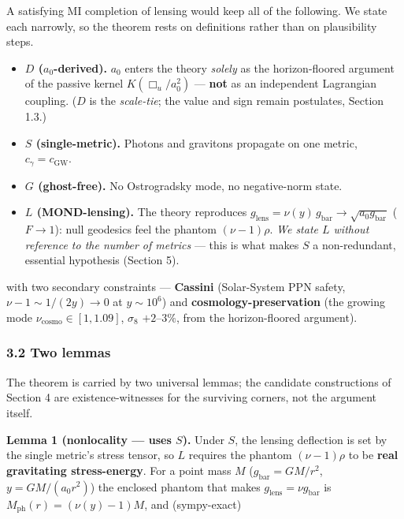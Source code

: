\documentclass[
]{article}
\providecommand{\tightlist}{%
  \setlength{\itemsep}{0pt}\setlength{\parskip}{0pt}}
\begin{document}
A satisfying MI completion of lensing would keep all of the following.
We state each narrowly, so the theorem rests on definitions rather than
on plausibility steps.

\begin{itemize}
\tightlist
\item
  \textbf{\(D\) (\(a_0\)-derived).} \(a_0\) enters the theory
  \emph{solely} as the horizon-floored argument of the passive kernel
  \(K(\Box_u/a_0^2)\) --- \textbf{not} as an independent Lagrangian
  coupling. (\(D\) is the \emph{scale-tie}; the value and sign remain
  postulates, Section 1.3.)
\item
  \textbf{\(S\) (single-metric).} Photons and gravitons propagate on one
  metric, \(c_\gamma=c_\mathrm{GW}\).
\item
  \textbf{\(G\) (ghost-free).} No Ostrogradsky mode, no negative-norm
  state.
\item
  \textbf{\(L\) (MOND-lensing).} The theory reproduces
  \(g_\mathrm{lens}=\nu(y)\,g_\mathrm{bar}\to\sqrt{a_0 g_\mathrm{bar}}\)
  (\(F\to1\)): null geodesics feel the phantom \((\nu-1)\rho\). \emph{We
  state \(L\) without reference to the number of metrics} --- this is
  what makes \(S\) a non-redundant, essential hypothesis (Section 5).
\end{itemize}

with two secondary constraints --- \textbf{Cassini} (Solar-System PPN
safety, \(\nu-1\sim 1/(2y)\to0\) at \(y\sim10^6\)) and
\textbf{cosmology-preservation} (the growing mode
\(\nu_\mathrm{cosmo}\in[1,1.09]\), \(\sigma_8\) \(+2\)--\(3\%\), from the
horizon-floored argument).

\subsubsection{3.2 Two lemmas}\label{two-lemmas}

The theorem is carried by two universal lemmas; the candidate
constructions of Section 4 are existence-witnesses for the surviving
corners, not the argument itself.

\textbf{Lemma 1 (nonlocality --- uses \(S\)).} Under \(S\), the lensing
deflection is set by the single metric's stress tensor, so \(L\)
requires the phantom \((\nu-1)\rho\) to be \textbf{real gravitating
stress-energy}. For a point mass \(M\) (\(g_\mathrm{bar}=GM/r^2\),
\(y=GM/(a_0r^2)\)) the enclosed phantom that makes
\(g_\mathrm{lens}=\nu g_\mathrm{bar}\) is \(M_\mathrm{ph}(r)=(\nu(y)-1)M\), and
(sympy-exact)
\end{document}
